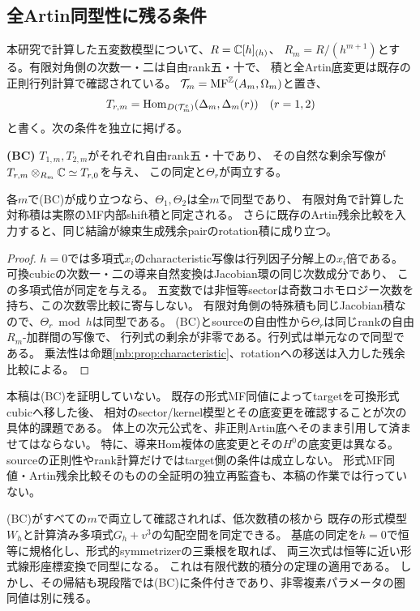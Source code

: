 \subsection{全Artin同型性に残る条件}
本研究で計算した五変数模型について、$R=\mathbb C[h]_{(h)}$、
$R_m=R/(h^{m+1})$とする。有限対角側の次数一・二は自由rank五・十で、
積と全Artin底変更は既存の正則行列計算で確認されている。
$\mathcal T_m=\operatorname{MF}^{\mathbb Z}(A_m,\Omega_m)$と置き、
\[
 T_{r,m}=\operatorname{Hom}_{D(\mathcal T_m^e)}(\Delta_m,\Delta_m(r))
 \quad(r=1,2)
\]
と書く。次の条件を独立に掲げる。

\noindent\textbf{(BC)} $T_{1,m},T_{2,m}$がそれぞれ自由rank五・十であり、
その自然な剰余写像が$T_{r,m}\otimes_{R_m}\mathbb C\simeq T_{r,0}$を与え、
この同定と$\Theta_r$が両立する。

\begin{theorem}[条件付きArtin同定]\label{mb:thm:artin-criterion}
各$m$で(BC)が成り立つなら、$\Theta_1,\Theta_2$は全$m$で同型であり、
有限対角で計算した対称積は実際のMF内部shift積と同定される。
さらに既存のArtin残余比較を入力すると、同じ結論が線束生成残余pairのrotation積に成り立つ。
\end{theorem}
\begin{proof}
$h=0$では多項式$x_i$のcharacteristic写像は行列因子分解上の$x_i$倍である。
可換cubicの次数一・二の導来自然変換はJacobian環の同じ次数成分であり、
この多項式倍が同定を与える\cite[Theorem~3.5, Remark~3.6]{MBLinZhang}。
五変数では非恒等sectorは奇数コホモロジー次数を持ち、この次数零比較に寄与しない。
有限対角側の特殊積も同じJacobian積なので、$\Theta_r\bmod h$は同型である。
(BC)とsourceの自由性から$\Theta_r$は同じrankの自由$R_m$-加群間の写像で、
行列式の剰余が非零である。行列式は単元なので同型である。
乗法性は命題\ref{mb:prop:characteristic}、rotationへの移送は入力した残余比較による。
\end{proof}

\begin{remark}[未確認の適用条件]\label{mb:rem:remaining}
本稿は(BC)を証明していない。
既存の形式MF同値によってtargetを可換形式cubicへ移した後、
相対のsector/kernel模型とその底変更を確認することが次の具体的課題である。
体上の次元公式を、非正則Artin底へそのまま引用して済ませてはならない。
特に、導来Hom複体の底変更とその$H^0$の底変更は異なる。
sourceの正則性やrank計算だけではtarget側の条件は成立しない。
形式MF同値・Artin残余比較そのものの全証明の独立再監査も、本稿の作業では行っていない。
\end{remark}

(BC)がすべての$m$で両立して確認されれば、低次数積の核から
既存の形式模型$W_h$と計算済み多項式$G_h+v^3$の勾配空間を同定できる。
基底の同定を$h=0$で恒等に規格化し、形式的symmetrizerの三乗根を取れば、
両三次式は恒等に近い形式線形座標変換で同型になる。
これは有限代数的積分の定理の適用である。
しかし、その帰結も現段階では(BC)に条件付きであり、非零複素パラメータの圏同値は別に残る。

